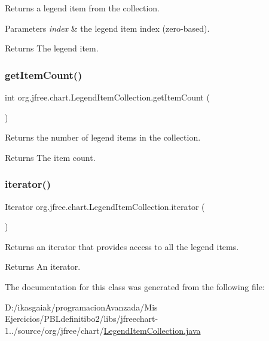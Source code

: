 Returns a legend item from the collection.


\begin{DoxyParams}{Parameters}
{\em index} & the legend item index (zero-\/based).\\
\hline
\end{DoxyParams}
\begin{DoxyReturn}{Returns}
The legend item. 
\end{DoxyReturn}
\mbox{\label{classorg_1_1jfree_1_1chart_1_1_legend_item_collection_ac24a3e4e29098c1bc37abd34d9cddbd4}} 
\subsubsection{\texorpdfstring{get\+Item\+Count()}{getItemCount()}}
{\footnotesize\ttfamily int org.\+jfree.\+chart.\+Legend\+Item\+Collection.\+get\+Item\+Count (\begin{DoxyParamCaption}{ }\end{DoxyParamCaption})}

Returns the number of legend items in the collection.

\begin{DoxyReturn}{Returns}
The item count. 
\end{DoxyReturn}
\mbox{\label{classorg_1_1jfree_1_1chart_1_1_legend_item_collection_a622118af323c29caa42b8657af1022b7}} 
\subsubsection{\texorpdfstring{iterator()}{iterator()}}
{\footnotesize\ttfamily Iterator org.\+jfree.\+chart.\+Legend\+Item\+Collection.\+iterator (\begin{DoxyParamCaption}{ }\end{DoxyParamCaption})}

Returns an iterator that provides access to all the legend items.

\begin{DoxyReturn}{Returns}
An iterator. 
\end{DoxyReturn}


The documentation for this class was generated from the following file\+:\begin{DoxyCompactItemize}
\item 
D\+:/ikasgaiak/programacion\+Avanzada/\+Mis Ejercicios/\+P\+B\+Ldefinitibo2/libs/jfreechart-\/1../source/org/jfree/chart/\mbox{\hyperlink{_legend_item_collection_8java}{Legend\+Item\+Collection.\+java}}\end{DoxyCompactItemize}
